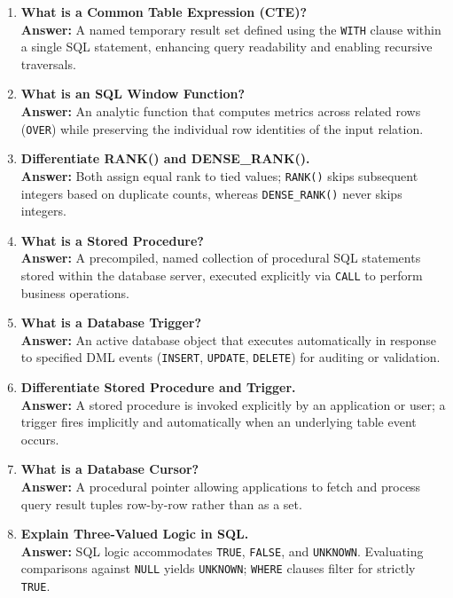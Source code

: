 \begin{enumerate}[label=\textbf{TA\arabic*.},leftmargin=1.2cm]
\item \textbf{What is a Common Table Expression (CTE)?} \\
\textbf{Answer:} A named temporary result set defined using the \texttt{WITH} clause within a single SQL statement, enhancing query readability and enabling recursive traversals.

\item \textbf{What is an SQL Window Function?} \\
\textbf{Answer:} An analytic function that computes metrics across related rows (\texttt{OVER}) while preserving the individual row identities of the input relation.

\item \textbf{Differentiate RANK() and DENSE\_RANK().} \\
\textbf{Answer:} Both assign equal rank to tied values; \texttt{RANK()} skips subsequent integers based on duplicate counts, whereas \texttt{DENSE\_RANK()} never skips integers.

\item \textbf{What is a Stored Procedure?} \\
\textbf{Answer:} A precompiled, named collection of procedural SQL statements stored within the database server, executed explicitly via \texttt{CALL} to perform business operations.

\item \textbf{What is a Database Trigger?} \\
\textbf{Answer:} An active database object that executes automatically in response to specified DML events (\texttt{INSERT}, \texttt{UPDATE}, \texttt{DELETE}) for auditing or validation.

\item \textbf{Differentiate Stored Procedure and Trigger.} \\
\textbf{Answer:} A stored procedure is invoked explicitly by an application or user; a trigger fires implicitly and automatically when an underlying table event occurs.

\item \textbf{What is a Database Cursor?} \\
\textbf{Answer:} A procedural pointer allowing applications to fetch and process query result tuples row-by-row rather than as a set.

\item \textbf{Explain Three-Valued Logic in SQL.} \\
\textbf{Answer:} SQL logic accommodates \texttt{TRUE}, \texttt{FALSE}, and \texttt{UNKNOWN}. Evaluating comparisons against \texttt{NULL} yields \texttt{UNKNOWN}; \texttt{WHERE} clauses filter for strictly \texttt{TRUE}.


\end{enumerate}
